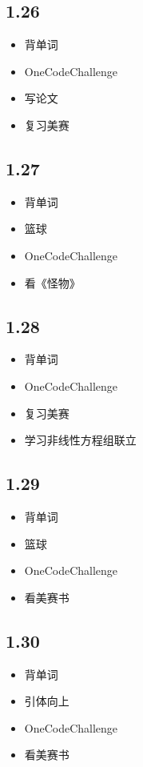 \documentclass[UTF8]{ctexart}
\begin{document}
\subsection*{1.26}
\begin{itemize}
    \item 背单词
    \item OneCodeChallenge
    \item 写论文
    \item 复习美赛
\end{itemize}

\subsection*{1.27}
\begin{itemize}
    \item 背单词
    \item 篮球
    \item OneCodeChallenge
    \item 看《怪物》
\end{itemize}

\subsection*{1.28}
\begin{itemize}
    \item 背单词
    \item OneCodeChallenge
    \item 复习美赛
    \item 学习非线性方程组联立
\end{itemize}

\subsection*{1.29}
\begin{itemize}
    \item 背单词
    \item 篮球
    \item OneCodeChallenge
    \item 看美赛书
\end{itemize}

\subsection*{1.30}
\begin{itemize}
    \item 背单词
    \item 引体向上
    \item OneCodeChallenge
    \item 看美赛书
\end{itemize}
\end{document}
